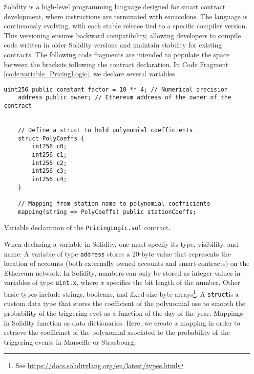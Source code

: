 \documentclass[10pt]{article}
\begin{document}
Solidity is a high-level programming language designed for smart contract development, where instructions are terminated with semicolons. The language is continuously evolving, with each stable release tied to a specific compiler version. This versioning ensures backward compatibility, allowing developers to compile code written in older Solidity versions and maintain stability for existing contracts. The following code fragments are intended to populate the space between the brackets following the contract declaration. In Code Fragment \ref{code:variable_PricingLogic}, we declare several variables.
\begin{codefragment}[!h]
\begin{lstlisting}[language=Solidity]
    uint256 public constant factor = 10 ** 4; // Numerical precision
    address public owner; // Ethereum address of the owner of the contract
    

    // Define a struct to hold polynomial coefficients
    struct PolyCoeffs {
        int256 c0;
        int256 c1;
        int256 c2;
        int256 c3;
        int256 c4;
    }

    // Mapping from station name to polynomial coefficients
    mapping(string => PolyCoeffs) public stationCoeffs;
\end{lstlisting}
    \caption{Variable declaration of the \texttt{PricingLogic.sol} contract.}
    \label{code:variable_PricingLogic}
\end{codefragment}
When declaring a variable in Solidity, one must specify its type, visibility, and name. A variable of type \texttt{address} stores a 20-byte value that represents the location of accounts (both externally owned accounts and smart contracts) on the Ethereum network. In Solidity, numbers can only be stored as integer values in variables of type \texttt{uint.x}, where \(x\) specifies the bit length of the number. Other basic types include strings, booleans, and fixed-size byte arrays\footnote{See \url{https://docs.soliditylang.org/en/latest/types.html}}. A \texttt{struct}is a custom data type that stores the coefficient of the polynomial use to smooth the probability of the triggering evet as a function of the day of the year. Mappings in Solidity function as data dictionaries. Here, we create a mapping in order to retrieve the coefficinet of the polynomial asociated to the probability of the triggering events in Marseille or Strasbourg. 
\end{document}
